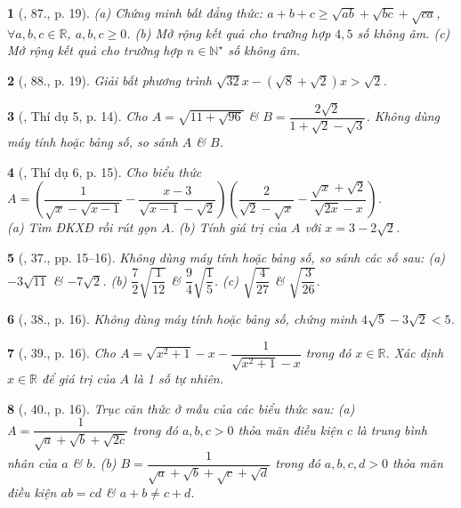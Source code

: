 \documentclass{article}
\newtheorem{baitoan}{}
\begin{document}
\begin{baitoan}[\cite{SBT_Toan_9_tap_1}, 87., p. 19]
	(a) Chứng minh bất đẳng thức: $a + b + c\ge\sqrt{ab} + \sqrt{bc} + \sqrt{ca}$,  $\forall a,b,c\in\mathbb{R}$, $a,b,c\ge0$. (b) Mở rộng kết quả cho trường hợp $4,5$ số không âm. (c) Mở rộng kết quả cho trường hợp $n\in\mathbb{N}^\star$ số không âm.
\end{baitoan}

\begin{baitoan}[\cite{SBT_Toan_9_tap_1}, 88., p. 19]
	Giải bất phương trình $\sqrt{32}x - (\sqrt{8} + \sqrt{2})x > \sqrt{2}$.
\end{baitoan}

\begin{baitoan}[\cite{Tuyen_Toan_9_old}, Thí dụ 5, p. 14]
	Cho $A = \sqrt{11 + \sqrt{96}}$ \& $B = \dfrac{2\sqrt{2}}{1 + \sqrt{2} - \sqrt{3}}$. Không dùng máy tính hoặc bảng số, so sánh $A$ \& $B$.
\end{baitoan}

\begin{baitoan}[\cite{Tuyen_Toan_9_old}, Thí dụ 6, p. 15]
	Cho biểu thức $A = \left(\dfrac{1}{\sqrt{x} - \sqrt{x - 1}} - \dfrac{x - 3}{\sqrt{x - 1} - \sqrt{2}}\right)\left(\dfrac{2}{\sqrt{2} - \sqrt{x}} - \dfrac{\sqrt{x} + \sqrt{2}}{\sqrt{2x} - x}\right)$.\\(a) Tìm ĐKXĐ rồi rút gọn $A$. (b) Tính giá trị của $A$ với $x = 3 - 2\sqrt{2}$.
\end{baitoan}

\begin{baitoan}[\cite{Tuyen_Toan_9_old}, 37., pp. 15--16]
	Không dùng máy tính hoặc bảng số, so sánh các số sau: (a) $-3\sqrt{11}$ \& $-7\sqrt{2}$. (b) $\dfrac{7}{2}\sqrt{\dfrac{1}{12}}$ \& $\dfrac{9}{4}\sqrt{\dfrac{1}{5}}$. (c) $\sqrt{\dfrac{4}{27}}$ \& $\sqrt{\dfrac{3}{26}}$.
\end{baitoan}

\begin{baitoan}[\cite{Tuyen_Toan_9_old}, 38., p. 16]
	Không dùng máy tính hoặc bảng số, chứng minh $4\sqrt{5} - 3\sqrt{2} < 5$.
\end{baitoan}

\begin{baitoan}[\cite{Tuyen_Toan_9_old}, 39., p. 16]
	Cho $A = \sqrt{x^2 + 1} - x - \dfrac{1}{\sqrt{x^2 + 1} - x}$ trong đó $x\in\mathbb{R}$. Xác định $x\in\mathbb{R}$ để giá trị của $A$ là 1 số tự nhiên.
\end{baitoan}

\begin{baitoan}[\cite{Tuyen_Toan_9_old}, 40., p. 16]
	Trục căn thức ở mẫu của các biểu thức sau: (a) $A = \dfrac{1}{\sqrt{a} + \sqrt{b} + \sqrt{2c}}$ trong đó $a,b,c > 0$ thỏa mãn điều kiện $c$ là trung bình nhân của $a$ \& $b$. (b) $B = \dfrac{1}{\sqrt{a} + \sqrt{b} + \sqrt{c} + \sqrt{d}}$ trong đó $a,b,c,d > 0$ thỏa mãn điều kiện $ab = cd$ \& $a + b\ne c + d$.
\end{baitoan}
\end{document}
